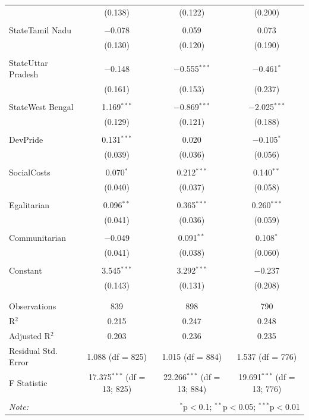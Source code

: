 \documentclass[
]{article}
\begin{document}
\begin{table}[!htbp]
\begin{tabular}{@{\extracolsep{5pt}}lccc}
  & (0.138) & (0.122) & (0.200) \\ 
  & & & \\ 
 StateTamil Nadu & $-$0.078 & 0.059 & 0.073 \\ 
  & (0.130) & (0.120) & (0.190) \\ 
  & & & \\ 
 StateUttar Pradesh & $-$0.148 & $-$0.555$^{***}$ & $-$0.461$^{*}$ \\ 
  & (0.161) & (0.153) & (0.237) \\ 
  & & & \\ 
 StateWest Bengal & 1.169$^{***}$ & $-$0.869$^{***}$ & $-$2.025$^{***}$ \\ 
  & (0.129) & (0.121) & (0.188) \\ 
  & & & \\ 
 DevPride & 0.131$^{***}$ & 0.020 & $-$0.105$^{*}$ \\ 
  & (0.039) & (0.036) & (0.056) \\ 
  & & & \\ 
 SocialCosts & 0.070$^{*}$ & 0.212$^{***}$ & 0.140$^{**}$ \\ 
  & (0.040) & (0.037) & (0.058) \\ 
  & & & \\ 
 Egalitarian & 0.096$^{**}$ & 0.365$^{***}$ & 0.260$^{***}$ \\ 
  & (0.041) & (0.036) & (0.059) \\ 
  & & & \\ 
 Communitarian & $-$0.049 & 0.091$^{**}$ & 0.108$^{*}$ \\ 
  & (0.041) & (0.038) & (0.060) \\ 
  & & & \\ 
 Constant & 3.545$^{***}$ & 3.292$^{***}$ & $-$0.237 \\ 
  & (0.143) & (0.131) & (0.208) \\ 
  & & & \\ 
\hline \\[-1.8ex] 
Observations & 839 & 898 & 790 \\ 
R$^{2}$ & 0.215 & 0.247 & 0.248 \\ 
Adjusted R$^{2}$ & 0.203 & 0.236 & 0.235 \\ 
Residual Std. Error & 1.088 (df = 825) & 1.015 (df = 884) & 1.537 (df = 776) \\ 
F Statistic & 17.375$^{***}$ (df = 13; 825) & 22.266$^{***}$ (df = 13; 884) & 19.691$^{***}$ (df = 13; 776) \\ 
\hline 
\hline \\[-1.8ex] 
\textit{Note:}  & \multicolumn{3}{r}{$^{*}$p$<$0.1; $^{**}$p$<$0.05; $^{***}$p$<$0.01} \\ 
\end{tabular} 
\end{table} 
\endgroup
\end{document}

